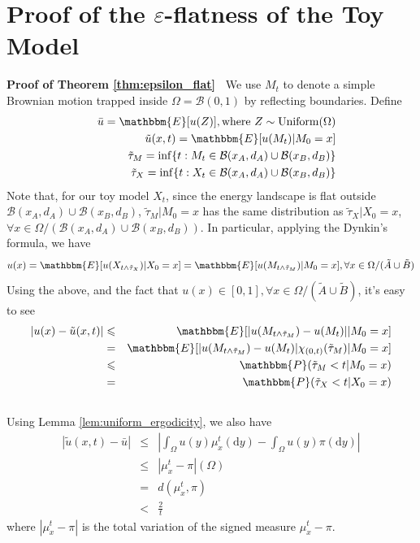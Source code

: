\documentclass[english, aip, jcp, priprint, graphicx]{revtex4-1}
\newcommand{\mathd}{\mathrm{d}}
\newcommand{\tmop}[1]{\ensuremath{\operatorname{#1}}}
\theoremstyle{plain}
\theoremstyle{definition}
\theoremstyle{plain}
\begin{document}
\section{Proof of the $\varepsilon$-flatness of the Toy Model}\label{sec:proof_epsilon_flat}

\noindent\textbf{Proof of Theorem \ref{thm:epsilon_flat}\ }
We use $M_t$ to denote a simple Brownian motion
trapped inside $\Omega = \mathcal{B} (0, 1)$ by reflecting boundaries. Define
\begin{eqnarray*}
&  & \bar{u} =\mathbbm{E} [u (Z)], \text{where } Z \sim \tmop{Uniform}
(\Omega)\\
&  & \tilde{u} (x, t) =\mathbbm{E} [u (M_t) |M_0 = x]\\
&  & \tilde{\tau}_M = \inf \{ t : M_t \in \mathcal{B} (x_A, d_A) \cup
\mathcal{B} (x_B, d_B) \}\\
&  & \tilde{\tau}_X = \inf \{ t : X_t \in \mathcal{B} (x_A, d_A) \cup
\mathcal{B} (x_B, d_B) \}
\end{eqnarray*}
Note that, for our toy model $X_t$, since the energy landscape is flat outside
$\mathcal{B} (x_A, d_A) \cup \mathcal{B} (x_B, d_B)$, $\tilde{\tau}_M |M_0 =
x$ has the same distribution as $\tilde{\tau}_X |X_0 = x$, $\forall x \in
\Omega / (\mathcal{B} (x_A, d_A) \cup \mathcal{B} (x_B, d_B))$. In particular,
applying the Dynkin's formula, we have
\[ u (x) =\mathbbm{E} [u (X_{t \wedge \tilde{\tau}_X}) |X_0 = x] =\mathbbm{E}
[u (M_{t \wedge \tilde{\tau}_M}) |M_0 = x], \forall x \in \Omega /
(\tilde{A} \cup \tilde{B}) \]
Using the above, and the fact that $u (x) \in [0, 1], \forall x \in \Omega /
(\tilde{A} \cup \tilde{B})$, it's easy to see
\begin{eqnarray*}
| u (x) - \tilde{u} (x, t) | & \leqslant & \mathbbm{E} [| u (M_{t \wedge
\tilde{\tau}_M}) - u (M_t) | |M_0 = x]\\
& = & \mathbbm{E} [| u (M_{t \wedge \tilde{\tau}_M}) - u (M_t) | \chi_{(0,
t)} (\tilde{\tau}_M) |M_0 = x]\\
& \leqslant & \mathbbm{P} (\tilde{\tau}_M < t|M_0 = x)\\
& = & \mathbbm{P} (\tilde{\tau}_X < t|X_0 = x)\\
&  & 
\end{eqnarray*}
Using Lemma \ref{lem:uniform_ergodicity}, we also have
\begin{eqnarray*}
| \tilde{u} (x, t) - \bar{u} | & \leqslant & \left| \int_{\Omega} u (y)
\mu_x^t (\mathd y) - \int_{\Omega} u (y) \pi (\mathd y) \right|\\
& \leqslant & | \mu_x^t - \pi | (\Omega)\\
& = & d (\mu_x^t, \pi)\\
& < & \frac{2}{t}
\end{eqnarray*}
where $| \mu_x^t - \pi |$ is the total variation of the signed measure
$\mu_x^t - \pi$.
\end{document}
